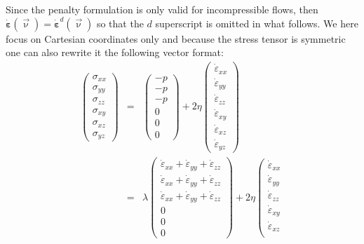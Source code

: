 Since the penalty formulation is only valid for incompressible flows, then 
$\dot{\bm \varepsilon}(\vec\upnu)=\dot{\bm \varepsilon}^d(\vec\upnu)$ so that 
the $d$ superscript is omitted in what follows. We here focus on Cartesian coordinates only
and because the stress tensor is symmetric one can also rewrite it the following vector format:
\begin{eqnarray}
\left(
\begin{array}{c}
\sigma_{xx}\\
\sigma_{yy}\\
\sigma_{zz}\\
\sigma_{xy}\\
\sigma_{xz}\\
\sigma_{yz}
\end{array}
\right)
&=&
\left(
\begin{array}{c}
-p\\
-p\\
-p\\
0\\
0\\
0
\end{array}
\right)
+2 \eta
\left(
\begin{array}{c}
\dot{\varepsilon}_{xx}\\
\dot{\varepsilon}_{yy}\\
\dot{\varepsilon}_{zz}\\
\dot{\varepsilon}_{xy}\\
\dot{\varepsilon}_{xz}\\
\dot{\varepsilon}_{yz}
\end{array}
\right)
\nonumber\\
&=&
\lambda
\left(
\begin{array}{c}
\dot{\varepsilon}_{xx} + \dot{\varepsilon}_{yy} + \dot{\varepsilon}_{zz}\\
\dot{\varepsilon}_{xx} + \dot{\varepsilon}_{yy} + \dot{\varepsilon}_{zz}\\
\dot{\varepsilon}_{xx} + \dot{\varepsilon}_{yy} + \dot{\varepsilon}_{zz}\\
0 \\ 0 \\ 0
\end{array}
\right)
+2 \eta
\left(
\begin{array}{c}
\dot{\varepsilon}_{xx}\\
\dot{\varepsilon}_{yy}\\
\dot{\varepsilon}_{zz}\\
\dot{\varepsilon}_{xy}\\
\dot{\varepsilon}_{xz}\\

\end{array}
\end{eqnarray}
